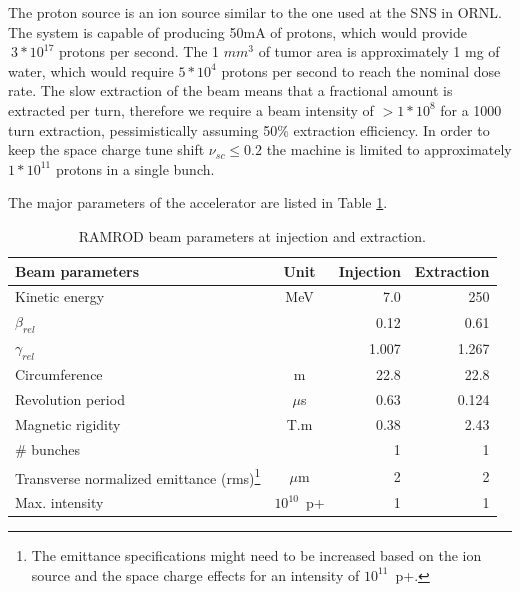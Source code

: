 The proton source is an ion source similar to the one used at the SNS in ORNL.  The system is capable of producing 50mA of protons, 
which would provide $~3*10^{17}$ protons per second.  The 1 $mm^3$ of tumor area is approximately 1 mg of water, which would require $5*10^4$ protons per second to 
reach the nominal dose rate.  The slow extraction of the beam means that a fractional amount is extracted per turn, therefore we require a beam intensity of 
$>1*10^8$ for a 1000 turn extraction, pessimistically assuming 50\% extraction efficiency.  In order to keep the space charge tune shift 
$\nu_{sc} \le 0.2$ the machine is limited to approximately $1*10^{11}$ protons in a single bunch. 

The major parameters of the accelerator are listed in Table \ref{tab:major}.  
\begin{table}[!hbt]
  \centering
  \begin{tabular}{lcrr}
    \hline 
    \textbf{Beam parameters}&\textbf{Unit}  &\textbf{Injection} &\textbf{Extraction}\\                        
    \hline \hline
    Kinetic energy      & MeV       & 7.0       & 250       \\
    $\beta_{rel}$     &       & 0.12 & 0.61   \\
    $\gamma_{rel}$      &       & 1.007         &1.267  \\
    Circumference   & m   &   22.8      & 22.8    \\
    Revolution period   & $\mu$s    & 0.63        &0.124    \\
    Magnetic rigidity   & T.m     & 0.38        &2.43 \\
    $\#$ bunches      &       &1        &1  \\
    Transverse normalized emittance (rms)\footnote{The emittance specifications might need to be increased based on the ion source and the space charge 
    effects for an intensity of $10^{11}$~p+. } & $\mu$m    & 2       &2\\
    Max. intensity  &   $10^{10}$~p+  &   1   & 1\\

    \hline
  \end{tabular}
  \caption{RAMROD beam parameters at injection and extraction.}
  \label{tab:major}
\end{table}



